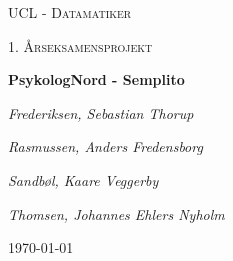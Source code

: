 




\begin{titlepage}
	\centering
	
	{\scshape\LARGE UCL - Datamatiker \par}
	\vspace{1cm}
	{\scshape\Large 1. Årseksamensprojekt\par}
	\vspace{1.5cm}
	{\huge\bfseries PsykologNord - Semplito\par}
	\vspace{2cm}
	{\Large\itshape Frederiksen, Sebastian Thorup\par}
    {\Large\itshape Rasmussen, Anders Fredensborg\par}
	{\Large\itshape Sandbøl, Kaare Veggerby\par}
	{\Large\itshape Thomsen, Johannes Ehlers Nyholm\par}
	\vfill

	\vfill

	{\large \today\par}
\end{titlepage}

\newpage

\clearpage
{}
\tableofcontents

\newpage












{}


